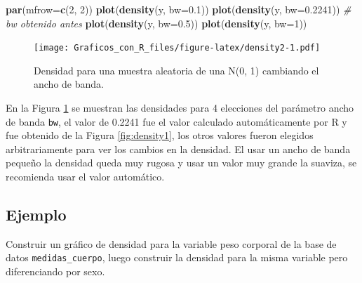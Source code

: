 \documentclass[10pt,]{krantz}
\makeatletter
\newenvironment{Shaded}{\begin{snugshade}}{\end{snugshade}}
\newcommand{\KeywordTok}[1]{\textcolor[rgb]{0.13,0.29,0.53}{\textbf{#1}}}
\newcommand{\DataTypeTok}[1]{\textcolor[rgb]{0.13,0.29,0.53}{#1}}
\newcommand{\DecValTok}[1]{\textcolor[rgb]{0.00,0.00,0.81}{#1}}
\newcommand{\FloatTok}[1]{\textcolor[rgb]{0.00,0.00,0.81}{#1}}
\newcommand{\CommentTok}[1]{\textcolor[rgb]{0.56,0.35,0.01}{\textit{#1}}}
\newcommand{\NormalTok}[1]{#1}
\let\proglang=\textsf
\newenvironment{kframe}{%
\medskip{}
\setlength{\fboxsep}{.8em}
 \def\at@end@of@kframe{}%
 \ifinner\ifhmode%
  \def\at@end@of@kframe{\end{minipage}}%
  \begin{minipage}{\columnwidth}%
 \fi\fi%
 \def\FrameCommand##1{\hskip\@totalleftmargin \hskip-\fboxsep
 \colorbox{shadecolor}{##1}\hskip-\fboxsep
     \hskip-\linewidth \hskip-\@totalleftmargin \hskip\columnwidth}%
 \MakeFramed {\advance\hsize-\width
   \@totalleftmargin\z@ \linewidth\hsize
   \@setminipage}}%
 {\par\unskip\endMakeFramed%
 \at@end@of@kframe}
\renewenvironment{Shaded}{\begin{kframe}}{\end{kframe}}
\makeatother
\begin{document}
\begin{Shaded}
\begin{Highlighting}[]
\KeywordTok{par}\NormalTok{(}\DataTypeTok{mfrow=}\KeywordTok{c}\NormalTok{(}\DecValTok{2}\NormalTok{, }\DecValTok{2}\NormalTok{))}
\KeywordTok{plot}\NormalTok{(}\KeywordTok{density}\NormalTok{(y, }\DataTypeTok{bw=}\FloatTok{0.1}\NormalTok{))}
\KeywordTok{plot}\NormalTok{(}\KeywordTok{density}\NormalTok{(y, }\DataTypeTok{bw=}\FloatTok{0.2241}\NormalTok{))  }\CommentTok{# bw obtenido antes}
\KeywordTok{plot}\NormalTok{(}\KeywordTok{density}\NormalTok{(y, }\DataTypeTok{bw=}\FloatTok{0.5}\NormalTok{))}
\KeywordTok{plot}\NormalTok{(}\KeywordTok{density}\NormalTok{(y, }\DataTypeTok{bw=}\DecValTok{1}\NormalTok{))}
\end{Highlighting}
\end{Shaded}

\begin{figure}
\centering
\texttt{[image: Graficos\_con\_R\_files/figure-latex/density2-1.pdf]}
\caption{\label{fig:density2}Densidad para una muestra aleatoria de una N(0,
1) cambiando el ancho de banda.}
\end{figure}

En la Figura \ref{fig:density2} se muestran las densidades para 4
elecciones del parámetro ancho de banda \texttt{bw}, el valor de 0.2241
fue el valor calculado automáticamente por \proglang{R} y fue obtenido
de la Figura \ref{fig:density1}, los otros valores fueron elegidos
arbitrariamente para ver los cambios en la densidad. El usar un ancho de
banda pequeño la densidad queda muy rugosa y usar un valor muy grande la
suaviza, se recomienda usar el valor automático.

\subsection*{Ejemplo}\label{ejemplo-8}


Construir un gráfico de densidad para la variable peso corporal de la
base de datos \texttt{medidas\_cuerpo}, luego construir la densidad para
la misma variable pero diferenciando por sexo.
\end{document}
